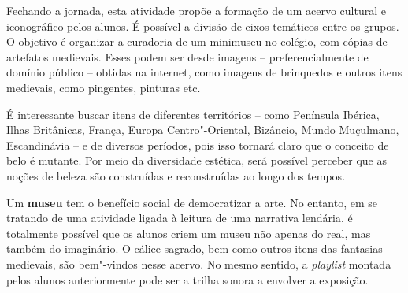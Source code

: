 \documentclass[11pt]{extarticle}
\begin{document}

Fechando a jornada, esta atividade propõe a formação de um
acervo cultural e iconográfico pelos alunos. É possível a divisão de
eixos temáticos entre os grupos. O objetivo é organizar a curadoria de
um minimuseu no colégio, com cópias de artefatos medievais. Esses podem
ser desde imagens -- preferencialmente de domínio público -- obtidas na
internet, como imagens de brinquedos e outros itens medievais, como
pingentes, pinturas etc.

É interessante buscar itens de diferentes territórios -- como Península
Ibérica, Ilhas Britânicas, França, Europa Centro"-Oriental, Bizâncio,
Mundo Muçulmano, Escandinávia -- e de diversos períodos, pois isso
tornará claro que o conceito de belo é mutante. Por meio da diversidade
estética, será possível perceber que as noções de beleza são construídas
e reconstruídas ao longo dos tempos.

Um \textbf{museu} tem o benefício social de democratizar a arte. No
entanto, em se tratando de uma atividade ligada à leitura de uma
narrativa lendária, é totalmente possível que os alunos criem um museu
não apenas do real, mas também do imaginário. O cálice sagrado, bem como
outros itens das fantasias medievais, são bem"-vindos nesse acervo. No
mesmo sentido, a \emph{playlist} montada pelos alunos anteriormente pode
ser a trilha sonora a envolver a exposição.
\end{document}
